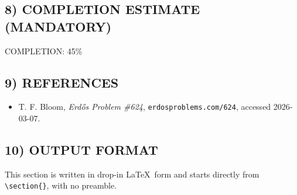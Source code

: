 \subsection*{8) COMPLETION ESTIMATE (MANDATORY)}

COMPLETION: 45\%

\subsection*{9) REFERENCES}

\begin{itemize}
\item T. F. Bloom, \emph{Erd\H{o}s Problem \#624}, \texttt{erdosproblems.com/624}, accessed 2026-03-07.
\end{itemize}

\subsection*{10) OUTPUT FORMAT}

This section is written in drop-in \LaTeX\ form and starts directly from \verb|\section{}|, with no preamble.

\bigskip

